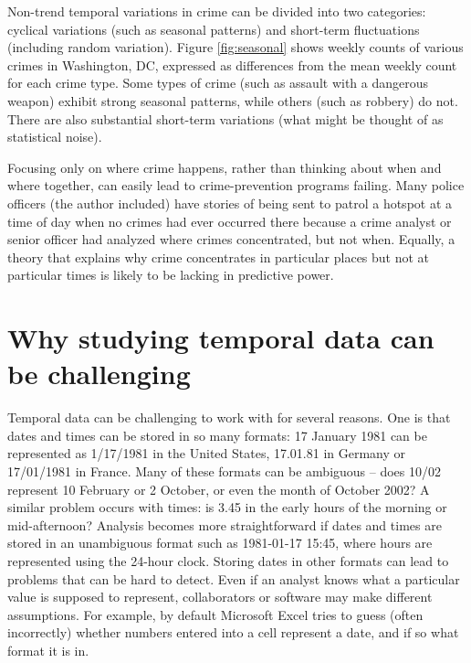 \documentclass[
  english,
  man,a4paper,mask,floatsintext]{apa6}
\begin{document}
Non-trend temporal variations in crime can be divided into two categories: cyclical variations (such as seasonal patterns) and short-term fluctuations (including random variation). Figure \ref{fig:seasonal} shows weekly counts of various crimes in Washington, DC, expressed as differences from the mean weekly count for each crime type. Some types of crime (such as assault with a dangerous weapon) exhibit strong seasonal patterns, while others (such as robbery) do not. There are also substantial short-term variations (what might be thought of as statistical noise).

Focusing only on where crime happens, rather than thinking about when and where together, can easily lead to crime-prevention programs failing. Many police officers (the author included) have stories of being sent to patrol a hotspot at a time of day when no crimes had ever occurred there because a crime analyst or senior officer had analyzed where crimes concentrated, but not when. Equally, a theory that explains why crime concentrates in particular places but not at particular times is likely to be lacking in predictive power.

\hypertarget{why-studying-temporal-data-can-be-challenging}{%
\section{Why studying temporal data can be challenging}\label{why-studying-temporal-data-can-be-challenging}}

Temporal data can be challenging to work with for several reasons. One is that dates and times can be stored in so many formats: 17 January 1981 can be represented as 1/17/1981 in the United States, 17.01.81 in Germany or 17/01/1981 in France. Many of these formats can be ambiguous -- does 10/02 represent 10 February or 2 October, or even the month of October 2002? A similar problem occurs with times: is 3.45 in the early hours of the morning or mid-afternoon? Analysis becomes more straightforward if dates and times are stored in an unambiguous format such as 1981-01-17 15:45, where hours are represented using the 24-hour clock. Storing dates in other formats can lead to problems that can be hard to detect. Even if an analyst knows what a particular value is supposed to represent, collaborators or software may make different assumptions. For example, by default Microsoft Excel tries to guess (often incorrectly) whether numbers entered into a cell represent a date, and if so what format it is in.
\end{document}
